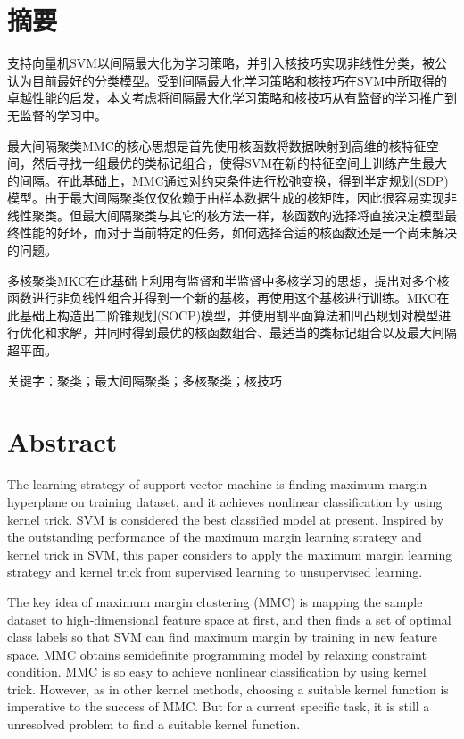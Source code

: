 \chapter*{摘\hspace{1em}要}
支持向量机SVM以间隔最大化为学习策略，并引入核技巧实现非线性分类，被公认为目前最好的分类模型。受到间隔最大化学习策略和核技巧在SVM中所取得的卓越性能的启发，本文考虑将间隔最大化学习策略和核技巧从有监督的学习推广到无监督的学习中。

最大间隔聚类MMC的核心思想是首先使用核函数将数据映射到高维的核特征空间，然后寻找一组最优的类标记组合，使得SVM在新的特征空间上训练产生最大的间隔。在此基础上，MMC通过对约束条件进行松弛变换，得到半定规划(SDP)模型。由于最大间隔聚类仅仅依赖于由样本数据生成的核矩阵，因此很容易实现非线性聚类。但最大间隔聚类与其它的核方法一样，核函数的选择将直接决定模型最终性能的好坏，而对于当前特定的任务，如何选择合适的核函数还是一个尚未解决的问题。

多核聚类MKC在此基础上利用有监督和半监督中多核学习的思想，提出对多个核函数进行非负线性组合并得到一个新的基核，再使用这个基核进行训练。MKC在此基础上构造出二阶锥规划(SOCP)模型，并使用割平面算法和凹凸规划对模型进行优化和求解，并同时得到最优的核函数组合、最适当的类标记组合以及最大间隔超平面。

{\heiti 关键字：}聚类；最大间隔聚类；多核聚类；核技巧


\newpage
\chapter*{\textbf{Abstract}}
The learning strategy of support vector machine is finding maximum margin hyperplane on training dataset, and it achieves nonlinear classification by using kernel trick. SVM is considered the best classified model at present. Inspired by the outstanding performance of the maximum margin learning strategy and kernel trick in SVM, this paper considers to apply the maximum margin learning strategy and kernel trick from supervised learning to unsupervised  learning. 

The key idea of maximum margin clustering (MMC) is mapping the sample dataset to high-dimensional feature space at first, and then finds a set of optimal class labels so that SVM can find maximum margin by training in new feature space. MMC obtains semidefinite programming model by relaxing constraint condition. MMC is so easy to achieve nonlinear classification by using kernel trick. However, as in other kernel methods, choosing a suitable kernel function is imperative to the success of MMC. But for a current specific task, it is still a unresolved problem to find a suitable kernel function.

